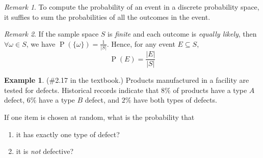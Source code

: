 \documentclass[11pt,letterpaper]{article}
\theoremstyle{definition}
\newtheorem{eg}{Example}
\theoremstyle{remark}
\newtheorem{rem}{Remark}[section]
\newcommand{\parens}[1]{\left(#1\right)}
\DeclareMathOperator{\Prob}{P}
\renewcommand{\P}[1]{\Prob{\parens{#1}}}
\begin{document}
\begin{rem}
    To compute the probability of an event in a discrete probability space, it
    suffies to sum the probabilities of all the outcomes in the event.
\end{rem}

\begin{rem}
    If the sample space $S$ is \emph{finite} and each outcome is
    \emph{equally likely}, then $\forall \omega \in S$, we have
    $\P{\{\omega\}} = \frac{1}{|S|}$. Hence, for any event $E \subseteq S$,
    \begin{equation*}
        \P{E} = \frac{|E|}{|S|}
    \end{equation*}
\end{rem}

\begin{eg}{(\#2.17 in the textbook.)}
    Products manufactured in a facility are tested for defects. Historical
    records indicate that $8\%$ of products have a type $A$ defect, $6\%$ have
    a type $B$ defect, and $2\%$ have both types of defects.

    If one item is chosen at random, what is the probability that
    \begin{enumerate}
        \item it has exactly one type of defect?
        \item it is \emph{not} defective?
    \end{enumerate}
\end{eg}
\end{document}
